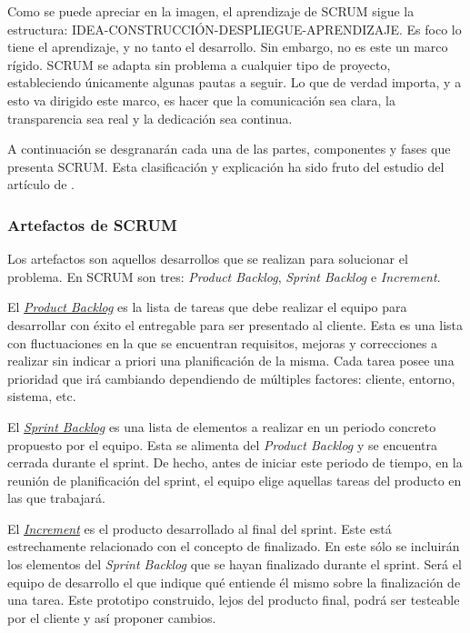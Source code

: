 
Como se puede apreciar en la imagen, el aprendizaje de SCRUM sigue la estructura: IDEA-CONSTRUCCIÓN-DESPLIEGUE-APRENDIZAJE. Es foco lo tiene el aprendizaje, y no tanto el desarrollo. Sin embargo, no es este un marco rígido. SCRUM se adapta sin problema a cualquier tipo de proyecto, estableciendo únicamente algunas pautas a seguir. Lo que de verdad importa, y a esto va dirigido este marco, es hacer que la comunicación sea clara, la transparencia sea real y la dedicación sea continua.

A continuación se desgranarán cada una de las partes, componentes y fases que presenta SCRUM. Esta clasificación y explicación ha sido fruto del estudio del artículo de .

\subsubsection{Artefactos de SCRUM}
Los artefactos son aquellos desarrollos que se realizan para solucionar el problema. En SCRUM son tres: \textit{Product Backlog}, \textit{Sprint Backlog} e \textit{Increment}.

El \underline{\textit{Product Backlog}} es la lista de tareas que debe realizar el equipo para desarrollar con éxito el entregable para ser presentado al cliente. Esta es una lista con fluctuaciones en la que se encuentran requisitos, mejoras y correcciones a realizar sin indicar a priori una planificación de la misma. Cada tarea posee una prioridad que irá cambiando dependiendo de múltiples factores: cliente, entorno, sistema, etc.

El \underline{\textit{Sprint Backlog}} es una lista de elementos a realizar en un periodo concreto propuesto por el equipo. Esta se alimenta del \textit{Product Backlog} y se encuentra cerrada durante el sprint. De hecho, antes de iniciar este periodo de tiempo, en la reunión de planificación del sprint, el equipo elige aquellas tareas del producto en las que trabajará.

El \underline{\textit{Increment}} es el producto desarrollado al final del sprint. Este está estrechamente relacionado con el concepto de finalizado. En este sólo se incluirán los elementos del \textit{Sprint Backlog} que se hayan finalizado durante el sprint. Será el equipo de desarrollo el que indique qué entiende él mismo sobre la finalización de una tarea. Este prototipo construido, lejos del producto final, podrá ser testeable por el cliente y así proponer cambios.

